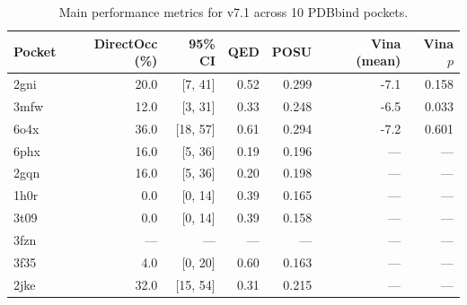 \begin{table}[t]
\centering
\caption{Main performance metrics for v7.1 across 10 PDBbind pockets.}
\label{tab:main_metrics}
\begin{tabular}{lrrrrrr}
\toprule
Pocket & DirectOcc (\%) & 95\% CI & QED & POSU & Vina (mean) & Vina $p$ \\
\midrule
2gni & 20.0 & [7, 41] & 0.52 & 0.299 & -7.1 & 0.158 \\
3mfw & 12.0 & [3, 31] & 0.33 & 0.248 & -6.5 & 0.033 \\
6o4x & 36.0 & [18, 57] & 0.61 & 0.294 & -7.2 & 0.601 \\
6phx & 16.0 & [5, 36] & 0.19 & 0.196 & — & — \\
2gqn & 16.0 & [5, 36] & 0.20 & 0.198 & — & — \\
1h0r & 0.0 & [0, 14] & 0.39 & 0.165 & — & — \\
3t09 & 0.0 & [0, 14] & 0.39 & 0.158 & — & — \\
3fzn & — & — & — & — & — & — \\
3f35 & 4.0 & [0, 20] & 0.60 & 0.163 & — & — \\
2jke & 32.0 & [15, 54] & 0.31 & 0.215 & — & — \\
\bottomrule
\end{tabular}
\end{table}
